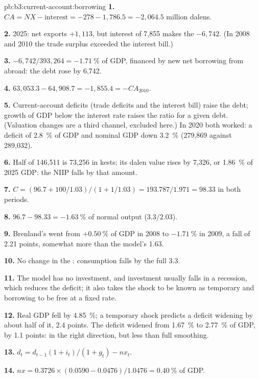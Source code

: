 \begin{solution}{pb:b3:current-account:borrowing}
\textbf{1.} $CA = NX - \text{interest} = -278 - 1{,}786.5 = -2{,}064.5$ million dalens. %

\textbf{2.} 2025: net exports $+1{,}113$, but interest of 7{,}855 makes the  $-6{,}742$. (In 2008 and 2010 the trade surplus exceeded the interest bill.)

\textbf{3.} $-6{,}742/393{,}264 = -1.71~\%$ of GDP, financed by new net borrowing from
abroad: the debt rose by 6{,}742.

\textbf{4.} $63{,}053.3 - 64{,}908.7 = -1{,}855.4 = -CA_{2010}$.

\textbf{5.} Current-account deficits (trade deficits and the interest bill) raise
the debt; growth of GDP below the interest rate raises the ratio for a given debt.
(Valuation changes are a third channel, excluded here.) In 2020 both worked: a
deficit of 2.8~\% of GDP and nominal GDP down 3.2~\% (279{,}869 against 289{,}032).

\textbf{6.} Half of 146{,}511 is 73{,}256 in kests; its dalen value rises by 7{,}326, or
1.86~\% of 2025 GDP: the NIIP falls by that amount.

\textbf{7.} $C = (96.7 + 100/1.03)/(1 + 1/1.03) = 193.787/1.971 = 98.33$ in both periods.

\textbf{8.} $96.7 - 98.33 = -1.63~\%$ of normal output ($3.3/2.03$).

\textbf{9.} Brenland's  went from $+0.50~\%$ of GDP in 2008 to $-1.71~\%$ in
2009, a fall of 2.21 points, somewhat more than the model's 1.63.

\textbf{10.} No change in the : consumption falls by the full 3.3.

\textbf{11.} The model has no investment, and investment usually falls in a
recession, which reduces the deficit; it also takes the shock to be known as
temporary and borrowing to be free at a fixed rate.

\textbf{12.} Real GDP fell by 4.85~\%; a temporary shock predicts a deficit widening
by about half of it, 2.4 points. The deficit widened from 1.67~\% to 2.77~\% of GDP, by
1.1 points: in the right direction, but less than full smoothing.

\textbf{13.} $d_t = d_{t-1}(1 + i_t)/(1 + g_t) - nx_t$.

\textbf{14.} $nx = 0.3726 \times (0.0590 - 0.0476)/1.0476 = 0.40~\%$ of GDP.


\end{solution}

